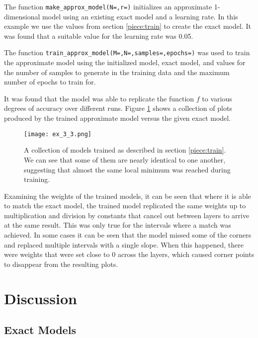 \documentclass{somasmsc}
\begin{document}
\begin{exa}
The function \verb|make_approx_model(N=,r=)| initializes an approximate 1-dimensional model using an existing exact model and a learning rate. In this example we use the values from section \ref{piece:train} to create the exact model. It was found that a suitable value for the learning rate was 0.05.

The function \verb|train_approx_model(M=,N=,samples=,epochs=)| was used to train the approximate model using the initialized model, exact model, and values for the number of samples to generate in the training data and the maximum number of epochs to train for.

It was found that the model was able to replicate the function $f$ to various degrees of accuracy over different runs. Figure \ref{piece:ex_3_3} shows a collection of plots produced by the trained approximate model versus the given exact model.

\begin{figure}[H]\label{piece:ex_3_3}
\begin{center}
\texttt{[image: ex\_3\_3.png]}
\end{center}
\caption{A collection of models trained as described in section \ref{piece:train}. We can see that some of them are nearly identical to one another, suggesting that almost the same local minimum was reached during training.}
\end{figure}

Examining the weights of the trained models, it can be seen that where it is able to match the exact model, the trained model replicated the same weights up to multiplication and division by constants that cancel out between layers to arrive at the same result. This was only true for the intervals where a match was achieved. In some cases it can be seen that the model missed some of the corners and replaced multiple intervals with a single slope. When this happened, there were weights that were set close to 0 across the layers, which caused corner points to disappear from the resulting plots.
\end{exa}

\section{Discussion}

\subsection{Exact Models}
\end{document}
